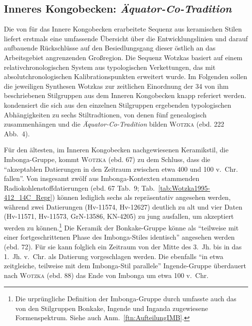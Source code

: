 \subsection{Inneres Kongobecken: \textit{Äquator-Co-Tradition}}\label{sec:ICB_StilGrDatierungen}

Die von \textcite{Wotzka.1995} für das Innere Kongobecken erarbeitete Sequenz aus keramischen Stilen liefert erstmals eine umfassende Übersicht über die Entwicklungslinien und darauf aufbauende Rückschlüsse auf den Besiedlungsgang dieser östlich an das Arbeitsgebiet angrenzenden Großregion. Die Sequenz Wotzkas basiert auf einem relativchronologischen System aus typologischen Verkettungen, das mit absolutchronologischen Kalibrationspunkten erweitert wurde. Im Folgenden sollen die jeweiligen Synthesen Wotzkas zur zeitlichen Einordnung der 34 von ihm beschriebenen Stilgruppen aus dem Inneren Kongobecken knapp referiert werden. \textcite[]{Wotzka.1995} kondensiert die sich aus den einzelnen Stilgruppen ergebenden typologischen Abhängigkeiten zu sechs Stiltradtionen, von denen fünf genealogisch zusammenhängen und die \textit{Äquator-Co-Tradition} bilden \textsc{Wotzka} (ebd. 222 Abb.~4).

Für den ältesten, im Inneren Kongobecken nachgewiesenen Keramikstil, die Imbonga-Gruppe, kommt \textsc{Wotzka} (ebd. 67) zu dem Schluss, dass die \enquote{akzeptablen Datierungen in den Zeitraum zwischen etwa 400 und 100 v.~Chr. fallen}. Von insgesamt zwölf aus Imbonga-Kontexten stammenden Radiokohlenstoffdatierungen (ebd. 67 Tab.~9; Tab.~\ref{tab:Wotzka1995-412_14C_Repr}) können lediglich sechs als repräsentativ angesehen werden, während zwei Datierungen (Hv-11574, Hv-12627) deutlich zu alt und vier Daten (Hv-11571, Hv-11573, GrN-13586, KN-4205) zu jung ausfallen, um akzeptiert werden zu können.\footnote{Die urprüngliche Definition der Imbonga-Gruppe durch \textcite{Eggert.1983} umfasste auch das von \textcite{Wotzka.1995} den Stilgruppen Bonkake, Ingende und Inganda zugewiesene Formenspektrum. Siehe auch Anm.~\ref{ftn:AufteilungIMB}.} Die Keramik der Bonkake-Gruppe könne als \enquote{teilweise mit einer fortgeschrittenen Phase des Imbonga-Stiles identisch} angesehen werden (ebd. 72). Für sie kann folglich ein Zeitraum von der Mitte des 3.~Jh. bis in das 1.~Jh. v.~Chr. als Datierung vorgeschlagen werden. Die ebenfalls \enquote{in etwa zeitgleiche, teilweise mit dem Imbonga-Stil parallele} Ingende-Gruppe überdauert nach \textsc{Wotzka} (ebd. 88) das Ende von Imbonga um etwa 100 v.~Chr.

